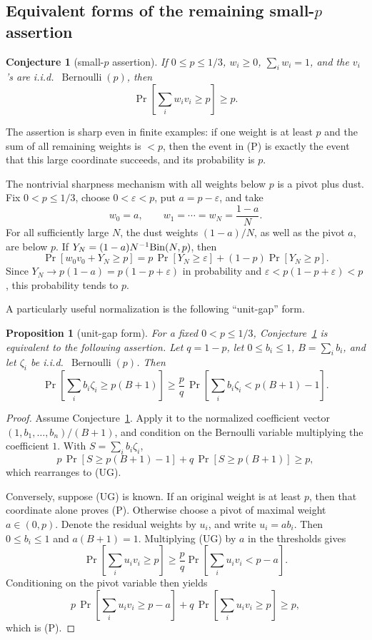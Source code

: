 \documentclass[12pt]{article}
\newtheorem{proposition}{Proposition}
\newtheorem{conjecture}{Conjecture}
\newcommand{\Ber}{\operatorname{Bernoulli}}
\begin{document}
\subsection*{Equivalent forms of the remaining small-\(p\) assertion}

\begin{conjecture}[small-\(p\) assertion]\label{conj:missing}
If \(0\le p\le1/3\), \(w_i\ge0\), \(\sum_iw_i=1\), and the \(v_i\)'s are
i.i.d.\ \(\Ber(p)\), then
\[
   \Pr\!\left[\sum_i w_i v_i\ge p\right]\ge p .
\]
\end{conjecture}

The assertion is sharp even in finite examples: if one weight is at least \(p\) and
the sum of all remaining weights is \(<p\), then the event in (P) is exactly
the event that this large coordinate succeeds, and its probability is \(p\).

The nontrivial sharpness mechanism with all weights below \(p\) is a pivot plus
dust.  Fix \(0<p\le1/3\), choose \(0<\varepsilon<p\), put
\(a=p-\varepsilon\), and take
\[
   w_0=a,\qquad
   w_1=\cdots=w_N=\frac{1-a}{N}.
\]
For all sufficiently large \(N\), the dust weights \((1-a)/N\), as well as the
pivot \(a\), are below \(p\).
If \(Y_N=(1-a)N^{-1}{\rm Bin}(N,p)\), then
\[
 \Pr\!\left[w_0v_0+Y_N\ge p\right]
 =
 p\,\Pr[Y_N\ge\varepsilon]+(1-p)\Pr[Y_N\ge p].
\]
Since \(Y_N\to p(1-a)=p(1-p+\varepsilon)\) in probability and
\(\varepsilon<p(1-p+\varepsilon)<p\), this probability tends to \(p\).

A particularly useful normalization is the following ``unit-gap'' form.

\begin{proposition}[unit-gap form]\label{prop:unitgap}
For a fixed \(0<p\le1/3\), Conjecture~\ref{conj:missing} is equivalent to the
following assertion.  Let \(q=1-p\), let \(0\le b_i\le1\),
\(B=\sum_i b_i\), and let \(\zeta_i\) be i.i.d.\ \(\Ber(p)\).  Then
\[
 \Pr\!\left[\sum_i b_i\zeta_i\ge p(B+1)\right]
 \ge
 \frac{p}{q}\,
 \Pr\!\left[\sum_i b_i\zeta_i<p(B+1)-1\right].            \tag{UG}
\]
\end{proposition}

\begin{proof}
Assume Conjecture~\ref{conj:missing}.  Apply it to the normalized coefficient vector
\((1,b_1,\ldots,b_n)/(B+1)\), and condition on the
Bernoulli variable multiplying the coefficient \(1\).  With
\(S=\sum_i b_i\zeta_i\),
\[
 p\,\Pr[S\ge p(B+1)-1]+q\,\Pr[S\ge p(B+1)]\ge p,
\]
which rearranges to (UG).

Conversely, suppose (UG) is known.  If an original weight is at least \(p\),
then that coordinate alone proves (P).  Otherwise choose a pivot of maximal
weight \(a\in(0,p)\).  Denote the residual weights by \(u_i\), and write
\(u_i=a b_i\).  Then \(0\le b_i\le1\) and \(a(B+1)=1\).  Multiplying (UG) by \(a\) in the thresholds
gives
\[
 \Pr\!\left[\sum_i u_i v_i\ge p\right]
 \ge \frac pq
 \Pr\!\left[\sum_i u_i v_i<p-a\right].
\]
Conditioning on the pivot variable then yields
\[
 p\,\Pr\!\left[\sum_i u_i v_i\ge p-a\right]
 +q\,\Pr\!\left[\sum_i u_i v_i\ge p\right]\ge p,
\]
which is (P).
\end{proof}
\end{document}
